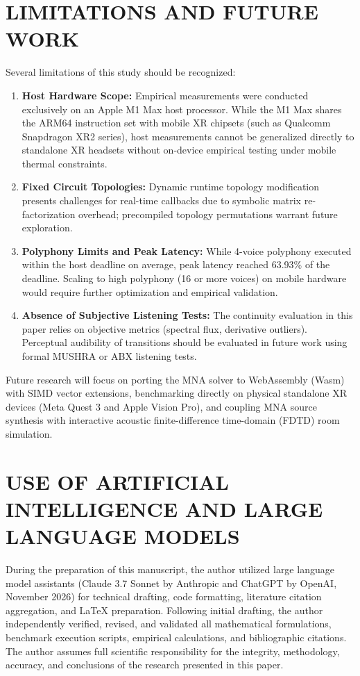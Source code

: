 \documentclass[fleqn,final]{jaes}
\begin{document}
\section{LIMITATIONS AND FUTURE WORK}

Several limitations of this study should be recognized:
\begin{enumerate}
\item \textbf{Host Hardware Scope:} Empirical measurements were conducted exclusively on an Apple M1 Max host processor. While the M1 Max shares the ARM64 instruction set with mobile XR chipsets (such as Qualcomm Snapdragon XR2 series), host measurements cannot be generalized directly to standalone XR headsets without on-device empirical testing under mobile thermal constraints.
\item \textbf{Fixed Circuit Topologies:} Dynamic runtime topology modification presents challenges for real-time callbacks due to symbolic matrix re-factorization overhead; precompiled topology permutations warrant future exploration.
\item \textbf{Polyphony Limits and Peak Latency:} While 4-voice polyphony executed within the host deadline on average, peak latency reached 63.93\% of the deadline. Scaling to high polyphony (16 or more voices) on mobile hardware would require further optimization and empirical validation.
\item \textbf{Absence of Subjective Listening Tests:} The continuity evaluation in this paper relies on objective metrics (spectral flux, derivative outliers). Perceptual audibility of transitions should be evaluated in future work using formal MUSHRA or ABX listening tests.
\end{enumerate}

Future research will focus on porting the MNA solver to WebAssembly (Wasm) with SIMD vector extensions, benchmarking directly on physical standalone XR devices (Meta Quest 3 and Apple Vision Pro), and coupling MNA source synthesis with interactive acoustic finite-difference time-domain (FDTD) room simulation.

\section{USE OF ARTIFICIAL INTELLIGENCE AND LARGE LANGUAGE MODELS}

During the preparation of this manuscript, the author utilized large language model assistants (Claude 3.7 Sonnet by Anthropic and ChatGPT by OpenAI, November 2026) for technical drafting, code formatting, literature citation aggregation, and LaTeX preparation. Following initial drafting, the author independently verified, revised, and validated all mathematical formulations, benchmark execution scripts, empirical calculations, and bibliographic citations. The author assumes full scientific responsibility for the integrity, methodology, accuracy, and conclusions of the research presented in this paper.
\end{document}
